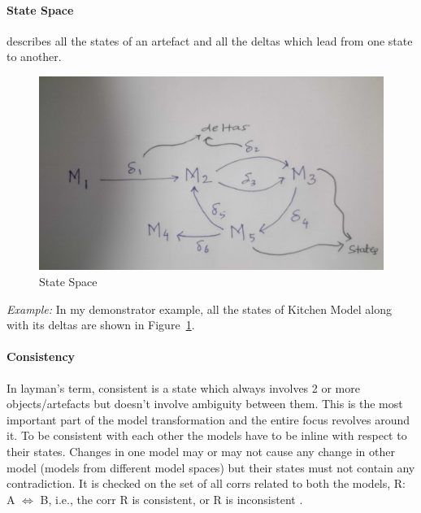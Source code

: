 \paragraph{State Space} describes all the states of an artefact and all the deltas which lead from one state to another.
\begin{figure}
	\includegraphics[width=1\textwidth]{figures/State_Space}
	\caption{State Space}
	\label{fig:StateSpace_Diagram}
\end{figure}
\newline\newline\textit{Example:} In my demonstrator example, all the states of Kitchen Model along with its deltas are shown in Figure~\ref{fig:StateSpace_Diagram}.

\paragraph{Consistency} In layman's term, consistent is a state which always involves 2 or more objects/artefacts but doesn't involve ambiguity between them. This is the most important part of the model transformation and the entire focus revolves around it. To be consistent with each other the models have to be inline with respect to their states. Changes in one model may or may not cause any change in other model (models from different model spaces) but their states must not contain any contradiction. It is checked on the set of all corrs related to both the models,
R: A $\Longleftrightarrow$ B, i.e., the corr R is consistent, or R is inconsistent \cite{benchmarx-reload}.

